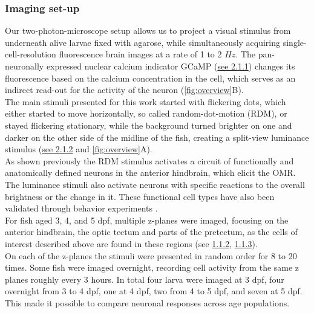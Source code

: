 \documentclass[12pt, a4paper, oneside]{article}
\begin{document}
\subsubsection{Imaging set-up}
Our two-photon-microscope setup allows us to project a visual stimulus from underneath alive larvae fixed with agarose, while simultaneously acquiring single-cell-resolution fluorescence brain images at a rate of  1 to 2 $Hz$. The pan-neuronally expressed nuclear calcium indicator GCaMP (\hyperref[sec:fishlines]{see 2.1.1}) changes its fluorescence based on the calcium concentration in the cell, which serves as an indirect read-out for the activity of the neuron (\autoref{fig:overview}B).\\
The main stimuli presented for this work started with flickering dots, which either started to move horizontally, so called random-dot-motion (RDM), or stayed flickering stationary, while the background turned brighter on one and darker on the other side of the midline of the fish, creating a split-view luminance stimulus (\hyperref[sec:stimuli]{see 2.1.2} and \autoref{fig:overview}A).\\
As shown previously \parencite{bahlNeuralCircuitsEvidence2020, boulanger-weillCorrelativeLightElectron2025}
the RDM stimulus activates a circuit of functionally and anatomically defined neurons in the anterior hindbrain, which elicit the OMR.
The luminance stimuli also activate neurons with specific reactions to the overall brightness or the change in it. These functional cell types have also been validated through behavior experiments \parencite{slangewalVisuomotorDecisionmakingMultifeature2026}.\\
For fish aged  3, 4, and 5 dpf, multiple z-planes were imaged, focusing on the anterior hindbrain, the optic tectum and parts of the pretectum, as the cells of interest described above are found in these regions (see \hyperref[sec:omr]{1.1.2}, \hyperref[sec:phototaxis]{1.1.3}).\\
On each of the z-planes the stimuli were presented in random order for 8 to 20 times. Some fish were imaged overnight, recording cell activity from the same z planes roughly every 3 hours.
In total four larva were imaged at 3 dpf, four overnight from 3 to 4 dpf, one at 4 dpf, two from 4 to 5 dpf, and seven at 5 dpf.\\
This made it possible to compare neuronal responses across age populations.\\
\end{document}
